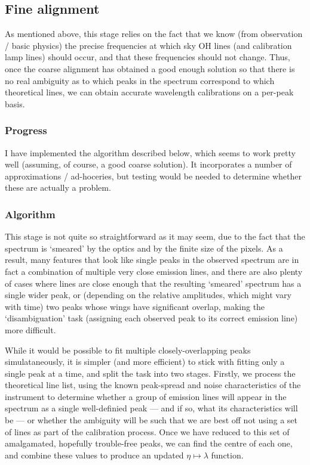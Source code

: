 

\subsection{Fine alignment}

As mentioned above, this stage relies on the fact that we know (from
observation / basic physics) the precise frequencies at which sky OH lines
(and calibration lamp lines) should occur, and that these frequencies should
not change. Thus, once the coarse alignment has obtained a good enough solution
so that there is no real ambiguity as to which peaks in the spectrum correspond
to which theoretical lines, we can obtain accurate wavelength calibrations on a
per-peak basis.

\subsubsection{Progress}

I have implemented the algorithm described below, which seems to work pretty well
(assuming, of course, a good coarse solution). It incorporates a number of
approximations / ad-hoceries, but testing would be needed to determine whether
these are actually a problem.

\subsubsection{Algorithm}

This stage is not quite so straightforward as it may seem, due to the
fact that the spectrum is `smeared' by the optics and by the finite size
of the pixels. As a result, many features that look like single peaks in
the observed spectrum are in fact a combination of multiple very close
emission lines, and there are also plenty of cases where lines are close
enough that the resulting `smeared' spectrum has a single wider peak, or
(depending on the relative amplitudes, which might vary with time) two
peaks whose wings have significant overlap, making the `disambiguation'
task (assigning each observed peak to its correct emission line) more
difficult.

While it would be possible to fit multiple closely-overlapping peaks
simulataneously, it is simpler (and more efficient) to stick with
fitting only a single peak at a time, and split the task into two
stages. Firstly, we process the theoretical line list, using the known
peak-spread and noise characteristics of the instrument to determine
whether a group of emission lines will appear in the spectrum as a
single well-definied peak --- and if so, what its characteristics will
be --- or whether the ambiguity will be such that we are best off not
using a set of lines as part of the calibration process. Once we have
reduced to this set of amalgamated, hopefully trouble-free peaks, we
can find the centre of each one, and combine these values to produce an
updated $\eta \mapsto \lambda$ function.


